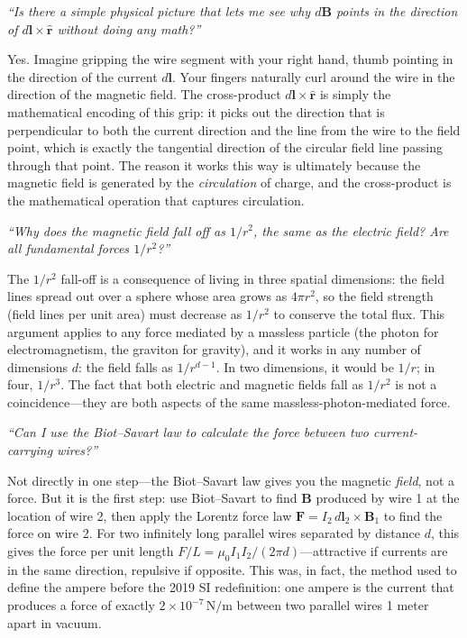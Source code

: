 \documentclass[11pt,openright]{book}
\begin{document}
\textit{``Is there a simple physical picture that lets me see why $d\mathbf{B}$ points in the direction of $d\mathbf{l}\times\hat{\mathbf{r}}$ without doing any math?''}

Yes. Imagine gripping the wire segment with your right hand, thumb pointing in the direction of the current $d\mathbf{l}$. Your fingers naturally curl around the wire in the direction of the magnetic field. The cross-product $d\mathbf{l}\times\hat{\mathbf{r}}$ is simply the mathematical encoding of this grip: it picks out the direction that is perpendicular to both the current direction and the line from the wire to the field point, which is exactly the tangential direction of the circular field line passing through that point. The reason it works this way is ultimately because the magnetic field is generated by the \emph{circulation} of charge, and the cross-product is the mathematical operation that captures circulation.

\textit{``Why does the magnetic field fall off as $1/r^2$, the same as the electric field? Are all fundamental forces $1/r^2$?''}

The $1/r^2$ fall-off is a consequence of living in three spatial dimensions: the field lines spread out over a sphere whose area grows as $4\pi r^2$, so the field strength (field lines per unit area) must decrease as $1/r^2$ to conserve the total flux. This argument applies to any force mediated by a massless particle (the photon for electromagnetism, the graviton for gravity), and it works in any number of dimensions $d$: the field falls as $1/r^{d-1}$. In two dimensions, it would be $1/r$; in four, $1/r^3$. The fact that both electric and magnetic fields fall as $1/r^2$ is not a coincidence---they are both aspects of the same massless-photon-mediated force.

\textit{``Can I use the Biot--Savart law to calculate the force between two current-carrying wires?''}

Not directly in one step---the Biot--Savart law gives you the magnetic \emph{field}, not a force. But it is the first step: use Biot--Savart to find $\mathbf{B}$ produced by wire 1 at the location of wire 2, then apply the Lorentz force law $\mathbf{F} = I_2\,d\mathbf{l}_2\times\mathbf{B}_1$ to find the force on wire 2. For two infinitely long parallel wires separated by distance $d$, this gives the force per unit length $F/L = \mu_0 I_1 I_2/(2\pi d)$---attractive if currents are in the same direction, repulsive if opposite. This was, in fact, the method used to define the ampere before the 2019 SI redefinition: one ampere is the current that produces a force of exactly $2\times 10^{-7}\,\text{N/m}$ between two parallel wires 1 meter apart in vacuum.
\end{document}
